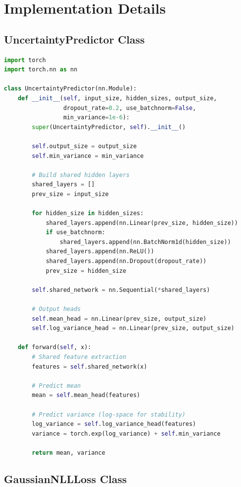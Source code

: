 \documentclass[11pt,a4paper]{article}
\begin{document}
\section{Implementation Details}

\subsection{UncertaintyPredictor Class}

\begin{lstlisting}[language=Python, caption=Core model implementation]
import torch
import torch.nn as nn

class UncertaintyPredictor(nn.Module):
    def __init__(self, input_size, hidden_sizes, output_size,
                 dropout_rate=0.2, use_batchnorm=False,
                 min_variance=1e-6):
        super(UncertaintyPredictor, self).__init__()

        self.output_size = output_size
        self.min_variance = min_variance

        # Build shared hidden layers
        shared_layers = []
        prev_size = input_size

        for hidden_size in hidden_sizes:
            shared_layers.append(nn.Linear(prev_size, hidden_size))
            if use_batchnorm:
                shared_layers.append(nn.BatchNorm1d(hidden_size))
            shared_layers.append(nn.ReLU())
            shared_layers.append(nn.Dropout(dropout_rate))
            prev_size = hidden_size

        self.shared_network = nn.Sequential(*shared_layers)

        # Output heads
        self.mean_head = nn.Linear(prev_size, output_size)
        self.log_variance_head = nn.Linear(prev_size, output_size)

    def forward(self, x):
        # Shared feature extraction
        features = self.shared_network(x)

        # Predict mean
        mean = self.mean_head(features)

        # Predict variance (log-space for stability)
        log_variance = self.log_variance_head(features)
        variance = torch.exp(log_variance) + self.min_variance

        return mean, variance
\end{lstlisting}

\subsection{GaussianNLLLoss Class}
\end{document}
